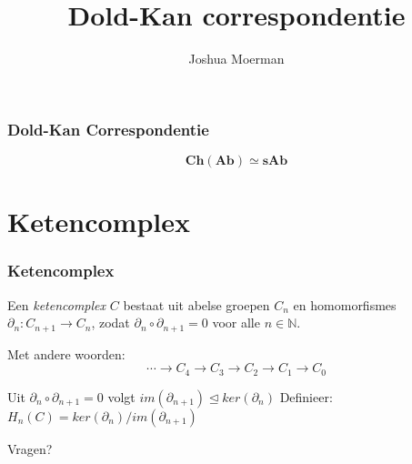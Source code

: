 \documentclass[14pt]{beamer}
\title{Dold-Kan correspondentie}
\author{Joshua Moerman}
\institute[Radboud Universiteit Nijmegen]{Begeleid door Moritz Groth}
\date{}
\newcommand{\N}{\mathbb{N}}
\newcommand{\cat}[1]{\mathbf{#1}}
\newcommand{\del}{\partial}
\begin{document}
\begin{frame}
  \titlepage
\end{frame}

\begin{frame}
\frametitle{Dold-Kan Correspondentie}
\huge $$ \cat{Ch(Ab)} \simeq \cat{sAb} $$
\end{frame}

\section{Ketencomplex}
\begin{frame}
\frametitle{Ketencomplex}
\begin{definition}
	Een \emph{ketencomplex} $C$ bestaat uit abelse groepen $C_n$ en homomorfismes $\del_n : C_{n+1} \to C_n$, zodat $\del_n \circ \del_{n+1} = 0$ voor alle $n \in \N$.
\end{definition}
\pause
\bigskip
Met andere woorden:
$$ \cdots \to C_4 \to C_3 \to C_2 \to C_1 \to C_0 $$
\end{frame}

\begin{frame}
Uit $\del_n \circ \del_{n+1} = 0$ volgt $im(\del_{n+1}) \trianglelefteq ker(\del_n)$
\pause
Definieer: $H_n(C) = ker(\del_n) / im(\del_{n+1})$
\end{frame}

\begin{frame}
\begin{center}
\Huge Vragen?
\end{center}
\end{frame}
\end{document}

